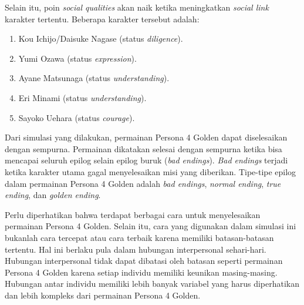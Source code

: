 Selain itu, poin \textit{social qualities} akan naik ketika meningkatkan \textit{social link} karakter tertentu. Beberapa karakter tersebut adalah:
\begin{enumerate}
    \item Kou Ichijo/Daisuke Nagase (status \textit{diligence}).
    \item Yumi Ozawa (status \textit{expression}).
    \item Ayane Matsunaga (status \textit{understanding}).
    \item Eri Minami (status \textit{understanding}).
    \item Sayoko Uehara (status \textit{courage}).
\end{enumerate}

Dari simulasi yang dilakukan, permainan Persona 4 Golden dapat diselesaikan dengan sempurna. Permainan dikatakan selesai dengan sempurna ketika bisa mencapai seluruh epilog selain epilog buruk (\textit{bad endings}). \textit{Bad endings} terjadi ketika karakter utama gagal menyelesaikan misi yang diberikan. Tipe-tipe epilog dalam permainan Persona 4 Golden adalah \textit{bad endings}, \textit{normal ending}, \textit{true ending}, dan \textit{golden ending}.

\pagebreak
Perlu diperhatikan bahwa terdapat berbagai cara untuk menyelesaikan permainan Persona 4 Golden. Selain itu, cara yang digunakan dalam simulasi ini bukanlah cara tercepat atau cara terbaik karena memiliki batasan-batasan tertentu. Hal ini berlaku pula dalam hubungan interpersonal sehari-hari. Hubungan interpersonal tidak dapat dibatasi oleh batasan seperti permainan Persona 4 Golden karena setiap individu memiliki keunikan masing-masing. Hubungan antar individu memiliki lebih banyak variabel yang harus diperhatikan dan lebih kompleks dari permainan Persona 4 Golden.


